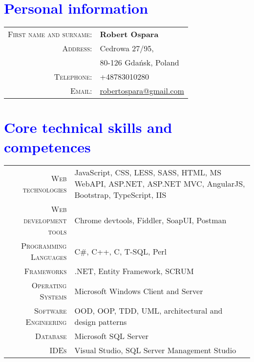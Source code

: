 \documentclass[a4paper,12pt]{article}
\begin{document}
\par{\bigskip\par}


\section{\textcolor{Blue}{Personal information}}

\begin{tabular}{rl}
	\textsc{First name and surname:}&  \textbf{Robert Ospara} \\
	\textsc{Address:}& Cedrowa 27/95, \\
	\textsc{}& 80-126 Gdańsk, Poland \\
	\textsc{Telephone:}& +48783010280 \\
	\textsc{Email:}& \href{mailto:robertospara@gmail.com}{robertospara@gmail.com}
\end{tabular}

\vspace{3em}

\section{\textcolor{Blue}{Core technical skills and competences}}
\begin{tabular}{r|p{9.5cm}}
	\textsc{Web technologies}
	&\footnotesize{JavaScript, CSS, LESS, SASS, HTML, MS WebAPI, ASP.NET, ASP.NET MVC, AngularJS, Bootstrap, TypeScript, IIS} \\
	\textsc{Web development tools}
	&\footnotesize{Chrome devtools, Fiddler, SoapUI, Postman} \\
	\textsc{Programming Languages}
	&\footnotesize{C\#, C++, C, T-SQL, Perl} \\
	\textsc{Frameworks}
	&\footnotesize{.NET, Entity Framework, SCRUM} \\
	\textsc{Operating Systems}
	&\footnotesize{Microsoft Windows Client and Server} \\
	\textsc{Software Engineering}
	&\footnotesize{OOD, OOP, TDD, UML, architectural and design patterns} \\
	\textsc{Database}
	&\footnotesize{Microsoft SQL Server} \\
	\textsc{IDEs}
	&\footnotesize{Visual Studio, SQL Server Management Studio} \\
\end{tabular}
\end{document}
